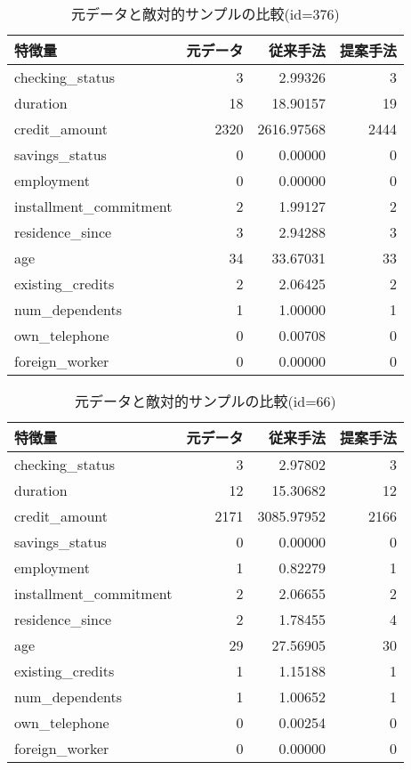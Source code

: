 \begin{table}[H]
    \centering
    \caption{元データと敵対的サンプルの比較(id=376)}
    \begin{tabular}{|l|r|r|r|} \hline
        特徴量 & 元データ & 従来手法 & 提案手法 \\ \hline
        checking\_status & 3 & 2.99326 & 3 \\ \hline
        duration & 18 & 18.90157 & 19 \\ \hline
        credit\_amount & 2320 & 2616.97568 & 2444 \\ \hline
        savings\_status & 0 & 0.00000 & 0 \\ \hline
        employment & 0 & 0.00000 & 0 \\ \hline
        installment\_commitment & 2 & 1.99127 & 2 \\ \hline
        residence\_since & 3 & 2.94288 & 3 \\ \hline
        age & 34 & 33.67031 & 33 \\ \hline
        existing\_credits & 2 & 2.06425 & 2 \\ \hline
        num\_dependents & 1 & 1.00000 & 1 \\ \hline
        own\_telephone & 0 & 0.00708 & 0 \\ \hline
        foreign\_worker & 0 & 0.00000 & 0 \\ \hline
    \end{tabular}
\end{table}

\begin{table}[H]
    \centering
    \caption{元データと敵対的サンプルの比較(id=66)}
    \begin{tabular}{|l|r|r|r|} \hline
        特徴量 & 元データ & 従来手法 & 提案手法 \\ \hline
        checking\_status & 3 & 2.97802 & 3 \\ \hline
        duration & 12 & 15.30682 & 12 \\ \hline
        credit\_amount & 2171 & 3085.97952 & 2166 \\ \hline
        savings\_status & 0 & 0.00000 & 0 \\ \hline
        employment & 1 & 0.82279 & 1 \\ \hline
        installment\_commitment & 2 & 2.06655 & 2 \\ \hline
        residence\_since & 2 & 1.78455 & 4 \\ \hline
        age & 29 & 27.56905 & 30 \\ \hline
        existing\_credits & 1 & 1.15188 & 1 \\ \hline
        num\_dependents & 1 & 1.00652 & 1 \\ \hline
        own\_telephone & 0 & 0.00254 & 0 \\ \hline
        foreign\_worker & 0 & 0.00000 & 0 \\ \hline
    \end{tabular}
\end{table}

